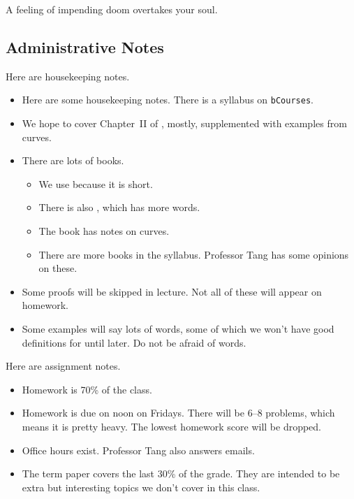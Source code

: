 \documentclass[../notes.tex]{subfiles}
\begin{document}
A feeling of impending doom overtakes your soul.

\subsection{Administrative Notes}
Here are housekeeping notes.
\begin{itemize}
	\item Here are some housekeeping notes. There is a syllabus on \texttt{bCourses}.
	\item We hope to cover Chapter~II of \cite{hartshorne}, mostly, supplemented with examples from curves.
	\item There are lots of books.
	\begin{itemize}
		\item We use \cite{hartshorne} because it is short.
		\item There is also \cite{rising-sea}, which has more words.
		\item The book \cite{liu-alg-geo-ari} has notes on curves.
		\item There are more books in the syllabus. Professor Tang has some opinions on these.
	\end{itemize}
	\item Some proofs will be skipped in lecture. Not all of these will appear on homework.
	\item Some examples will say lots of words, some of which we won't have good definitions for until later. Do not be afraid of words.
\end{itemize}
Here are assignment notes.
\begin{itemize}
	\item Homework is 70\% of the class.
	\item Homework is due on noon on Fridays. There will be 6--8 problems, which means it is pretty heavy. The lowest homework score will be dropped.
	\item Office hours exist. Professor Tang also answers emails.
	\item The term paper covers the last 30\% of the grade. They are intended to be extra but interesting topics we don't cover in this class.
\end{itemize}
\end{document}
